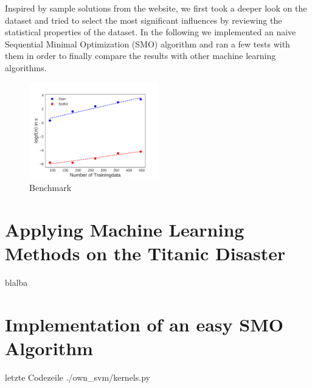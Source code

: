 Inspired by sample solutions from the website, we first took a deeper look on the dataset and tried to select the most significant influences by reviewing the statistical properties of the dataset. In the following we implemented an naive Sequential Minimal Optimization (SMO) algorithm and ran a few tests with them in order to finally compare the results with other machine learning algorithms.


\begin{figure}
  \centering
    \includegraphics[width=0.5\textwidth]{media_saved/benchmark}
  \caption{Benchmark}
  \label{fig:gull}
\end{figure}

\section{Applying Machine Learning Methods on the Titanic Disaster}
blalba
\section{Implementation of an easy SMO Algorithm}


 letzte Codezeile
{./own_svm/kernels.py}


\printbibliography %
        